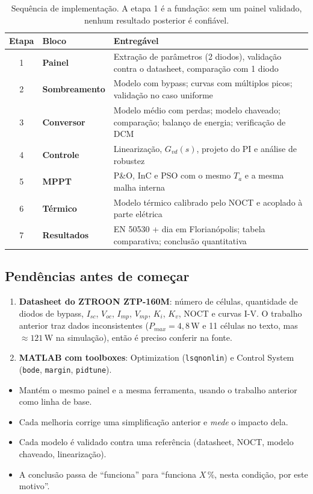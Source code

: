 \documentclass[11pt,a4paper]{article}
\begin{document}
\begin{table}[h]
\centering\small
\renewcommand{\arraystretch}{1.2}
\begin{tabularx}{\linewidth}{c >{\bfseries}l X}
\toprule
Etapa & Bloco & Entregável \\
\midrule
1 & Painel & Extração de parâmetros (2 diodos), validação contra o datasheet, comparação com 1 diodo \\
2 & Sombreamento & Modelo com bypass; curvas com múltiplos picos; validação no caso uniforme \\
3 & Conversor & Modelo médio com perdas; modelo chaveado; comparação; balanço de energia; verificação de DCM \\
4 & Controle & Linearização, $G_{vd}(s)$, projeto do PI e análise de robustez \\
5 & MPPT & P\&O, InC e PSO com o mesmo $T_a$ e a mesma malha interna \\
6 & Térmico & Modelo térmico calibrado pelo NOCT e acoplado à parte elétrica \\
7 & Resultados & EN 50530 + dia em Florianópolis; tabela comparativa; conclusão quantitativa \\
\bottomrule
\end{tabularx}
\caption{Sequência de implementação. A etapa 1 é a fundação: sem um painel validado, nenhum
resultado posterior é confiável.}
\end{table}

\subsection*{Pendências antes de começar}
\begin{enumerate}
\item \textbf{Datasheet do ZTROON ZTP-160M}: número de células, quantidade de diodos de
bypass, $I_{sc}$, $V_{oc}$, $I_{mp}$, $V_{mp}$, $K_i$, $K_v$, NOCT e curvas I-V. O trabalho
anterior traz dados inconsistentes ($P_{max}=4{,}8$\,W e 11 células no texto, mas
$\approx121$\,W na simulação), então é preciso conferir na fonte.
\item \textbf{MATLAB com toolboxes}: Optimization (\texttt{lsqnonlin}) e Control System
(\texttt{bode}, \texttt{margin}, \texttt{pidtune}).
\end{enumerate}

\begin{resumo}
\begin{itemize}
\item Mantém o mesmo painel e a mesma ferramenta, usando o trabalho anterior como linha de base.
\item Cada melhoria corrige uma simplificação anterior e \emph{mede} o impacto dela.
\item Cada modelo é validado contra uma referência (datasheet, NOCT, modelo chaveado, linearização).
\item A conclusão passa de ``funciona'' para ``funciona $X\,\%$, nesta condição, por este motivo''.
\end{itemize}
\end{resumo}
\end{document}

